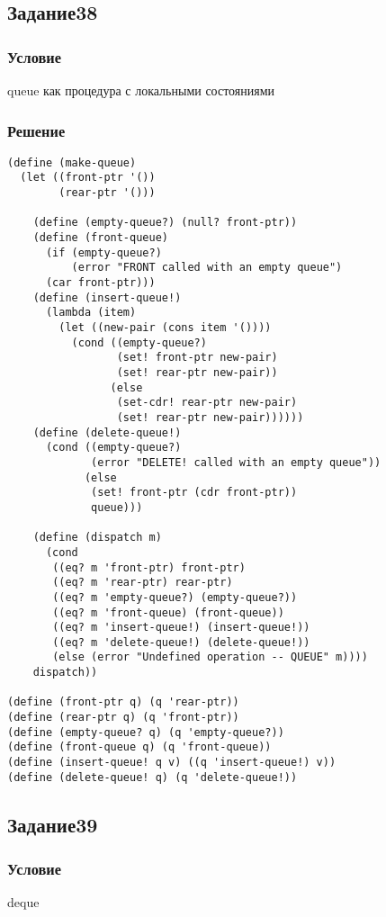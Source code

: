 \documentclass[10pt,a4paper]{article}
\begin{document}
\subsection*{Задание38}
\subsubsection*{Условие}
queue как процедура с локальными состояниями
\subsubsection*{Решение}
\begin{lstlisting}
(define (make-queue)
  (let ((front-ptr '())
        (rear-ptr '()))

    (define (empty-queue?) (null? front-ptr))
    (define (front-queue)
      (if (empty-queue?)
          (error "FRONT called with an empty queue")
      (car front-ptr)))
    (define (insert-queue!)
      (lambda (item)
        (let ((new-pair (cons item '())))
          (cond ((empty-queue?)
                 (set! front-ptr new-pair)
                 (set! rear-ptr new-pair))
                (else
                 (set-cdr! rear-ptr new-pair)
                 (set! rear-ptr new-pair))))))
    (define (delete-queue!)
      (cond ((empty-queue?)
             (error "DELETE! called with an empty queue"))
            (else
             (set! front-ptr (cdr front-ptr))
             queue)))

    (define (dispatch m)
      (cond
       ((eq? m 'front-ptr) front-ptr)
       ((eq? m 'rear-ptr) rear-ptr)
       ((eq? m 'empty-queue?) (empty-queue?))
       ((eq? m 'front-queue) (front-queue))
       ((eq? m 'insert-queue!) (insert-queue!))
       ((eq? m 'delete-queue!) (delete-queue!))
       (else (error "Undefined operation -- QUEUE" m))))
    dispatch))

(define (front-ptr q) (q 'rear-ptr))
(define (rear-ptr q) (q 'front-ptr))
(define (empty-queue? q) (q 'empty-queue?))
(define (front-queue q) (q 'front-queue))
(define (insert-queue! q v) ((q 'insert-queue!) v))
(define (delete-queue! q) (q 'delete-queue!))
\end{lstlisting}

\subsection*{Задание39}
\subsubsection*{Условие}
deque 
\end{document}
